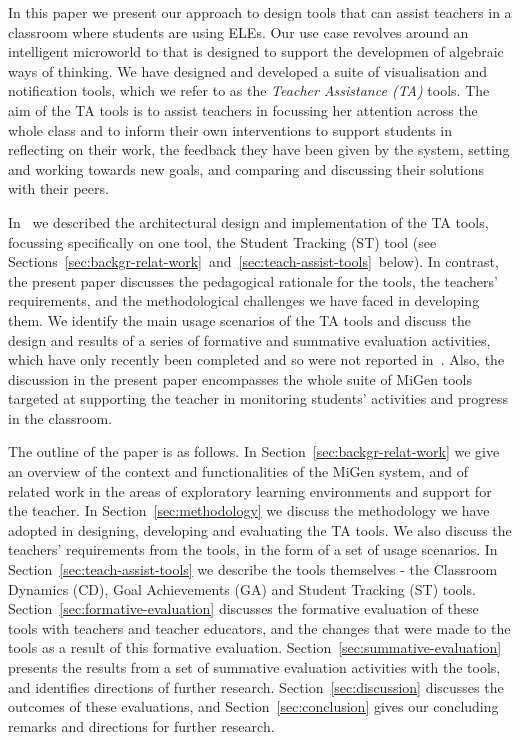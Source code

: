 In this paper we present our approach to design tools that can assist
 teachers in a classroom where students are using ELEs. Our use case
 revolves around an intelligent microworld to that is designed to
 support the developmen of algebraic ways of thinking. We have
 designed and developed a suite of visualisation and notification
tools, which we refer to as the {\em Teacher Assistance (TA)}
tools. The aim of the TA tools is to
assist teachers in focussing her attention across the whole class and to
inform their own interventions to support students in reflecting on
their work, the feedback they have been given by the system, setting
and working towards new goals, and comparing and discussing their
solutions with their peers. 

In~\cite{PearceLazard2010Design,IEEE-TLT-TA} we described the architectural design
and implementation of the TA tools, focussing specifically on one
tool, the Student Tracking (ST) tool (see
Sections~\ref{sec:backgr-relat-work}~and~\ref{sec:teach-assist-tools}~below). 
In contrast, the present paper discusses the pedagogical rationale for
the tools, the teachers’ requirements, and the methodological
challenges we have faced in developing them. We identify the main
usage scenarios of the TA tools and discuss the design and results of
a series of formative and summative evaluation activities, which have
only recently been completed and so were not reported
in~\cite{PearceLazard2010Design,IEEE-TLT-TA}. 
Also, the discussion in the present paper
encompasses the whole suite of MiGen tools targeted at supporting the
teacher in monitoring students’ activities and progress in the
classroom.
 
The outline of the paper is as follows. In
Section~\ref{sec:backgr-relat-work}  we give an
overview of the context and functionalities of the MiGen system, and
of related work in the areas of exploratory learning environments and
support for the teacher. In Section~\ref{sec:methodology}
we discuss the methodology we
have adopted in designing, developing and evaluating the TA tools. We
also discuss the teachers’ requirements from the tools, in the form of
a set of usage scenarios. In Section~\ref{sec:teach-assist-tools}
we describe the tools
themselves - the Classroom Dynamics (CD), Goal Achievements (GA) and
Student Tracking (ST) tools. Section~\ref{sec:formative-evaluation} 
discusses the formative
evaluation of these tools with teachers and teacher educators, and the
changes that were made to the tools as a result of this formative
evaluation. Section~\ref{sec:summative-evaluation} 
presents the results from a set of summative
evaluation activities with the tools, and identifies directions of
further research.  Section~\ref{sec:discussion} 
discusses the outcomes of these
evaluations, and Section~\ref{sec:conclusion} 
gives our concluding remarks and directions
for further research.


